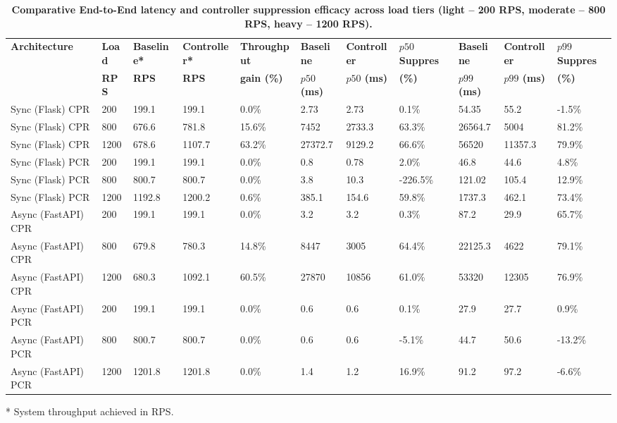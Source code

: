 \documentclass{ieeeaccess}
\begin{document}
	\begin{table}[htbp]
		\centering
		\caption{\textbf{Comparative End-to-End latency and controller suppression efficacy across load tiers (light -- 200 RPS, moderate -- 800 RPS, heavy -- 1200 RPS).}}
		\label{tab:compare-analysis}
		\setlength{\tabcolsep}{3pt}
		\begin{tabular}{lllllllllll}
			\hline
			\textbf{Architecture}& \textbf{Load}& \textbf{Baseline*}& \textbf{Controller*}& \textbf{Throughput}& \textbf{Baseline}& \textbf{Controller}& \textbf{{$p50$} Suppres}& \textbf{Baseline}& \textbf{Controller}& \textbf{{$p99$} Suppres}\\
			& \textbf{RPS}& \textbf{RPS}& \textbf{RPS}& \textbf{gain (\%)}& \textbf{{$p50$} (ms)}& \textbf{{$p50$} (ms)}& \textbf{(\%)}& \textbf{{$p99$} (ms)}& \textbf{{$p99$} (ms)}& \textbf{(\%)}\\
			\hline
			Sync (Flask) CPR & 200  & 199.1  & 199.1   & 0.0\%  & 2.73     & 2.73    & 0.1\%    & 54.35    & 55.2    & -1.5\%\\
			Sync (Flask) CPR & 800  & 676.6  & 781.8   & 15.6\% & 7452     & 2733.3  & 63.3\%   & 26564.7  & 5004    & 81.2\%\\
			Sync (Flask) CPR & 1200 & 678.6  & 1107.7  & 63.2\% & 27372.7  & 9129.2  & 66.6\%   & 56520    & 11357.3 & 79.9\%\\
			\hline
			Sync (Flask) PCR & 200  & 199.1   & 199.1  & 0.0\%  & 0.8    & 0.78    & 2.0\%    & 46.8     & 44.6    & 4.8\%\\
			Sync (Flask) PCR & 800  & 800.7   & 800.7  & 0.0\%  & 3.8    & 10.3    & -226.5\% & 121.02   & 105.4   & 12.9\%\\
			Sync (Flask) PCR & 1200 & 1192.8 & 1200.2  & 0.6\%  & 385.1  & 154.6   & 59.8\%   & 1737.3   & 462.1   & 73.4\%\\
			\hline
			Async (FastAPI) CPR & 200  & 199.1  & 199.1  & 0.0\%  & 3.2   & 3.2   & 0.3\%  & 87.2     & 29.9   & 65.7\% \\
			Async (FastAPI) CPR & 800  & 679.8  & 780.3  & 14.8\% & 8447  & 3005  & 64.4\% & 22125.3  & 4622   & 79.1\% \\
			Async (FastAPI) CPR & 1200 & 680.3  & 1092.1 & 60.5\% & 27870 & 10856 & 61.0\% & 53320    & 12305  & 76.9\% \\
			\hline
			Async (FastAPI) PCR & 200  & 199.1  & 199.1  & 0.0\%  & 0.6   & 0.6   & 0.1\%  & 27.9   & 27.7 & 0.9\% \\
			Async (FastAPI) PCR & 800  & 800.7  & 800.7  & 0.0\%  & 0.6   & 0.6   & -5.1\% & 44.7   & 50.6 & -13.2\% \\
			Async (FastAPI) PCR & 1200 & 1201.8 & 1201.8 & 0.0\%  & 1.4   & 1.2   & 16.9\% & 91.2   & 97.2 & -6.6\% \\
			\hline
		\end{tabular}
		\begin{flushleft}
			\small{* System throughput achieved in RPS.}
		\end{flushleft}
	\end{table}
	
\end{document}
